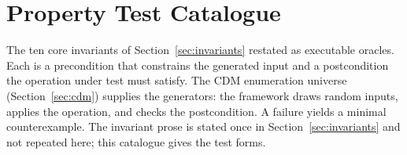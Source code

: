 \section{Property Test Catalogue}
\label{sec:appB}
\label{app:properties}

The ten core invariants of Section~\ref{sec:invariants} restated as executable oracles. Each is a precondition that constrains the generated input and a postcondition the operation under test must satisfy. The CDM enumeration universe (Section~\ref{sec:cdm}) supplies the generators: the framework draws random inputs, applies the operation, and checks the postcondition. A failure yields a minimal counterexample. The invariant prose is stated once in Section~\ref{sec:invariants} and not repeated here; this catalogue gives the test forms.

\renewcommand{\arraystretch}{1.3}
